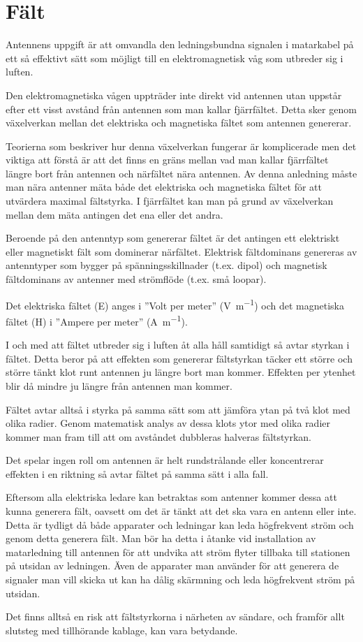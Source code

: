 \section{Fält}

Antennens uppgift är att omvandla den ledningsbundna signalen i matarkabel på
ett så effektivt sätt som möjligt till en elektromagnetisk våg som utbreder sig
i luften.

Den elektromagnetiska vågen uppträder inte direkt vid antennen utan uppstår
efter ett visst avstånd från antennen som man kallar fjärrfältet.
Detta sker genom växelverkan mellan det elektriska och magnetiska fältet som
antennen genererar.

Teorierna som beskriver hur denna växelverkan fungerar är komplicerade men det
viktiga att förstå är att det finns en gräns mellan vad man kallar fjärrfältet
längre bort från antennen och närfältet nära antennen.
Av denna anledning måste man nära antenner mäta både det elektriska och
magnetiska fältet för att utvärdera maximal fältstyrka.
I fjärrfältet kan man på grund av växelverkan mellan dem mäta antingen det ena
eller det andra.

Beroende på den antenntyp som genererar fältet är det antingen ett elektriskt
eller magnetiskt fält som dominerar närfältet.
Elektrisk fältdominans genereras av antenntyper som bygger på
spänningsskillnader (t.ex. dipol) och magnetisk fältdominans av antenner med
strömflöde (t.ex. små loopar).

Det elektriska fältet (E) anges i ''Volt per meter'' (\unit{\volt\per\metre})
och det magnetiska fältet (H) i ''Ampere per meter'' (\unit{\ampere\per\metre}).

I och med att fältet utbreder sig i luften åt alla håll samtidigt så avtar
styrkan i fältet.
Detta beror på att effekten som genererar fältstyrkan
täcker ett större och större
tänkt klot runt antennen ju längre bort man kommer.
Effekten per ytenhet blir då mindre ju längre från antennen man kommer.

Fältet avtar alltså i styrka på samma sätt som att jämföra ytan på två klot med
olika radier.
Genom matematisk analys av dessa klots ytor med olika radier kommer man fram
till att om avståndet dubbleras halveras fältstyrkan.

Det spelar ingen roll om antennen är helt rundstrålande eller koncentrerar
effekten i en riktning så avtar fältet på samma sätt i alla fall.

Eftersom alla elektriska ledare kan betraktas som antenner kommer dessa att
kunna generera fält, oavsett om det är tänkt att det ska vara en antenn eller
inte.
Detta är tydligt då både apparater och ledningar kan leda högfrekvent ström och
genom detta generera fält.
Man bör ha detta i åtanke vid installation av matarledning till antennen för att
undvika att ström flyter tillbaka till stationen på utsidan av ledningen.
Även de apparater man använder för att generera de signaler man vill skicka ut
kan ha dålig skärmning och leda högfrekvent ström på utsidan.

Det finns alltså en risk att fältstyrkorna i närheten av sändare, och framför
allt slutsteg med tillhörande kablage, kan vara betydande.
